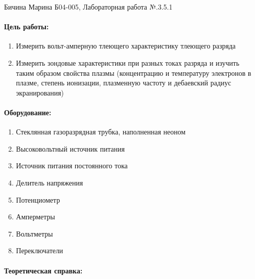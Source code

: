 \documentclass[a4paper,12pt]{article}
\author{Бичина Марина 
группа Б04-005 1 курса ФЭФМ}
\title{}
\date{}
\begin{document}

\begin{center}
\begin{Large}
{Бичина Марина Б04-005, Лабораторная работа №.3.5.1}
\end{Large}
\end{center}
\paragraph{Цель работы:} 
\begin{enumerate}
\itemsep0em
\item Измерить вольт-амперную тлеющего характеристику тлеющего разряда 
\item Измерить зондовые характеристики при разных токах разряда и изучить таким образом свойства плазмы (концентрацию и температуру электронов в плазме, степень ионизации,  плазменную частоту и дебаевский радиус экранирования)
\end{enumerate}
\paragraph{Оборудование:}
\begin{enumerate}
\itemsep0em
\item Стеклянная газоразрядная трубка, наполненная неоном
\item Высоковольтный источник питания 
\item Источник питания постоянного тока
\item Делитель напряжения
\item Потенциометр
\item Амперметры
\item Вольтметры
\item Переключатели
\end{enumerate}


\paragraph{Теоретическая справка:}
\end{document}

